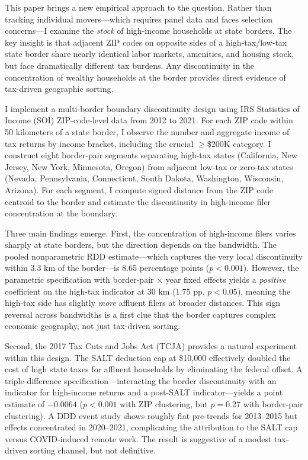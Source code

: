 \documentclass[12pt]{article}
\begin{document}
This paper brings a new empirical approach to the question. Rather than tracking individual movers---which requires panel data and faces selection concerns---I examine the \textit{stock} of high-income households at state borders. The key insight is that adjacent ZIP codes on opposite sides of a high-tax/low-tax state border share nearly identical labor markets, amenities, and housing stock, but face dramatically different tax burdens. Any discontinuity in the concentration of wealthy households at the border provides direct evidence of tax-driven geographic sorting.

I implement a multi-border boundary discontinuity design using IRS Statistics of Income (SOI) ZIP-code-level data from 2012 to 2021. For each ZIP code within 50 kilometers of a state border, I observe the number and aggregate income of tax returns by income bracket, including the crucial $\geq$\$200K category. I construct eight border-pair segments separating high-tax states (California, New Jersey, New York, Minnesota, Oregon) from adjacent low-tax or zero-tax states (Nevada, Pennsylvania, Connecticut, South Dakota, Washington, Wisconsin, Arizona). For each segment, I compute signed distance from the ZIP code centroid to the border and estimate the discontinuity in high-income filer concentration at the boundary.

Three main findings emerge. First, the concentration of high-income filers varies sharply at state borders, but the direction depends on the bandwidth. The pooled nonparametric RDD estimate---which captures the very local discontinuity within 3.3 km of the border---is 8.65 percentage points ($p < 0.001$). However, the parametric specification with border-pair $\times$ year fixed effects yields a \textit{positive} coefficient on the high-tax indicator at 30 km (1.75 pp, $p < 0.05$), meaning the high-tax side has slightly \textit{more} affluent filers at broader distances. This sign reversal across bandwidths is a first clue that the border captures complex economic geography, not just tax-driven sorting.

Second, the 2017 Tax Cuts and Jobs Act (TCJA) provides a natural experiment within this design. The SALT deduction cap at \$10,000 effectively doubled the cost of high state taxes for affluent households by eliminating the federal offset. A triple-difference specification---interacting the border discontinuity with an indicator for high-income returns and a post-SALT indicator---yields a point estimate of $-0.0064$ ($p < 0.001$ with ZIP clustering, but $p = 0.27$ with border-pair clustering). A DDD event study shows roughly flat pre-trends for 2013--2015 but effects concentrated in 2020--2021, complicating the attribution to the SALT cap versus COVID-induced remote work. The result is suggestive of a modest tax-driven sorting channel, but not definitive.
\end{document}
